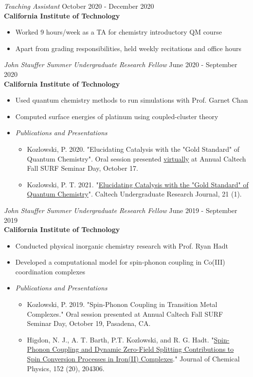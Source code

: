 \documentclass[margin,line]{resume}
\begin{document}
\begin{resume}
{\sl Teaching Assistant} \hfill October 2020 - December 2020\\
\textbf{California Institute of Technology}
\begin{itemize}
\item Worked 9 hours/week as a TA for chemistry introductory QM course
\item Apart from grading responsibilities, held weekly recitations and office hours
\end{itemize}
{\sl John Stauffer Summer Undergraduate Research Fellow} \hfill June 2020 - September 2020 \\
\textbf{California Institute of Technology}
\begin{itemize}
\item Used quantum chemistry methods to run simulations with Prof. Garnet Chan
\item Computed surface energies of platinum using coupled-cluster theory
\item \emph{Publications and Presentations}
    \begin{itemize}
        \item Kozlowski, P. 2020. "Elucidating Catalysis with the "Gold Standard" of Quantum Chemistry". Oral session presented \href{https://youtu.be/pcNnGM0bYRw}{virtually} at Annual Caltech Fall SURF Seminar Day, October 17.
        \item Kozlowski, P. T. 2021. "\href{https://curj.caltech.edu/2021/06/29/elucidating-catalysis-with-the-gold-standard-of-quantum-chemistry/}{Elucidating Catalysis with the "Gold Standard" of Quantum Chemistry}". Caltech Undergraduate Research Journal, 21 (1).
    \end{itemize}
\end{itemize} 
{\sl John Stauffer Summer Undergraduate Research Fellow} \hfill June 2019 - September 2019 \\
\textbf{California Institute of Technology}
\begin{itemize}
\item Conducted physical inorganic chemistry research with Prof. Ryan Hadt
\item Developed a computational model for spin-phonon coupling in Co(III)
coordination complexes
\item \emph{Publications and Presentations}
    \begin{itemize}
            \item Kozlowski, P. 2019. "Spin-Phonon Coupling in Transition Metal Complexes." Oral session presented at Annual Caltech Fall SURF Seminar Day, October 19, Pasadena, CA.
            \item Higdon, N. J., A. T. Barth, P.T. Kozlowski, and R. G. Hadt. "\href{https://doi.org/10.1063/5.0006361}{Spin-Phonon Coupling and Dynamic Zero-Field Splitting Contributions to Spin Conversion Processes in Iron(II) Complexes}." Journal of Chemical Physics, 152 (20), 204306.
    \end{itemize}
\end{itemize}

\end{resume}
\end{document}
